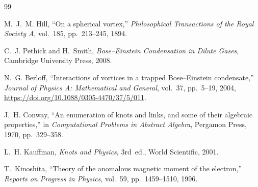 \documentclass[11pt]{article}
\begin{document}


\begin{thebibliography}{99}


 M.~J.~M. Hill, ``On a spherical vortex,'' \emph{Philosophical Transactions of the Royal Society A}, vol.~185, pp.~213--245, 1894.


 C.~J. Pethick and H.~Smith, \emph{Bose--Einstein Condensation in Dilute Gases}, Cambridge University Press, 2008.


 N.~G. Berloff, ``Interactions of vortices in a trapped Bose--Einstein condensate,'' \emph{Journal of Physics A: Mathematical and General}, vol.~37, pp.~5–19, 2004, \url{https://doi.org/10.1088/0305-4470/37/5/011}.


 J.~H. Conway, ``An enumeration of knots and links, and some of their algebraic properties,'' in \emph{Computational Problems in Abstract Algebra}, Pergamon Press, 1970, pp.~329–358.


 L.~H. Kauffman, \emph{Knots and Physics}, 3rd~ed., World Scientific, 2001.


 T.~Kinoshita, ``Theory of the anomalous magnetic moment of the electron,'' \emph{Reports on Progress in Physics}, vol.~59, pp.~1459–1510, 1996.


\end{thebibliography}
\end{document}
